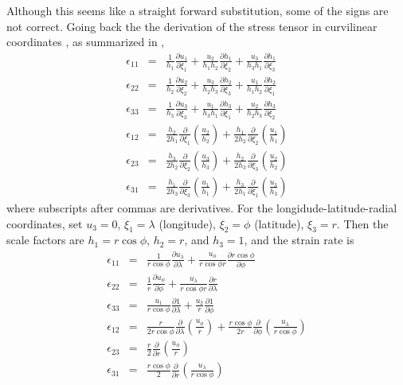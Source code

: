 \documentclass[11pt]{report}
\begin{document}
Although this seems like a straight forward substitution, some of the signs are not correct.  Going back the the derivation of the stress tensor in curvilinear coordinates \cite[Appendix 2, page 600]{Batchelor67book}, as summarized in \cite[Section 2b]{Hunke_Dukowicz02mwr}, 
\begin{eqnarray}
\epsilon_{11}&=&\frac{1}{h_1}\frac{\partial u_1 }{\partial \xi_1} + \frac{u_2}{h_1 h_2}\frac{\partial h_1 }{\partial \xi_2} + \frac{u_3}{h_3 h_1}\frac{\partial h_1 }{\partial \xi_3} \\
\epsilon_{22}&=&\frac{1}{h_2}\frac{\partial u_2 }{\partial \xi_2} + \frac{u_3}{h_2 h_3}\frac{\partial h_2 }{\partial \xi_3} + \frac{u_1}{h_1 h_2}\frac{\partial h_2 }{\partial \xi_1} \\
\epsilon_{33}&=&\frac{1}{h_3}\frac{\partial u_3 }{\partial \xi_3} + \frac{u_1}{h_3 h_1}\frac{\partial h_3 }{\partial \xi_1} + \frac{u_2}{h_2 h_3}\frac{\partial h_3 }{\partial \xi_2} \\
\epsilon_{12}&=&\frac{h_2}{2h_1} \frac{\partial }{\partial \xi_1}\left(\frac{u_2}{h_2}\right) + \frac{h_1}{2h_2} \frac{\partial }{\partial \xi_2}\left(\frac{u_1}{h_1}\right) \\
\epsilon_{23}&=&\frac{h_3}{2h_2} \frac{\partial }{\partial \xi_2}\left(\frac{u_3}{h_3}\right) + \frac{h_2}{2h_3} \frac{\partial }{\partial \xi_3}\left(\frac{u_2}{h_2}\right) \\
\epsilon_{31}&=&\frac{h_1}{2h_3} \frac{\partial }{\partial \xi_3}\left(\frac{u_1}{h_1}\right) + \frac{h_3}{2h_1} \frac{\partial }{\partial \xi_1}\left(\frac{u_3}{h_3}\right) 
\end{eqnarray}
where subscripts after commas are derivatives.  For the longidude-latitude-radial coordinates, set $u_3=0$, $\xi_1=\lambda$ (longitude), $\xi_2=\phi$ (latitude), $\xi_3=r$.  Then the scale factors are $h_1=r \cos\phi$, $h_2=r$, and $h_3=1$, and the strain rate is 
\begin{eqnarray}
\epsilon_{11}&=&\frac{1}{r \cos\phi} \frac{\partial u_\lambda }{\partial \lambda} + \frac{u_\phi}{r \cos\phi r}\frac{\partial r \cos\phi }{\partial \phi} \\
\epsilon_{22}&=&\frac{1}{r} \frac{\partial u_\phi }{\partial \phi} + \frac{u_\lambda}{r \cos\phi r}\frac{\partial r }{\partial \lambda} \\
\epsilon_{33}&=& \frac{u_1}{ r \cos\phi}\frac{\partial 1 }{\partial \lambda} + \frac{u_2}{r }\frac{\partial 1 }{\partial \phi} \\
\epsilon_{12}&=&\frac{r}{2r \cos\phi} \frac{\partial }{\partial \lambda}\left(\frac{u_\phi}{r}\right) + \frac{r \cos\phi}{2r} \frac{\partial }{\partial \phi}\left(\frac{u_\lambda}{r \cos\phi}\right) \\
\epsilon_{23}&=&\frac{r}{2} \frac{\partial }{\partial r}\left(\frac{u_\phi}{r}\right) \\
\epsilon_{31}&=&\frac{r \cos\phi}{2} \frac{\partial }{\partial r}\left(\frac{u_\lambda}{r \cos\phi}\right) 
\end{eqnarray}
\end{document}
